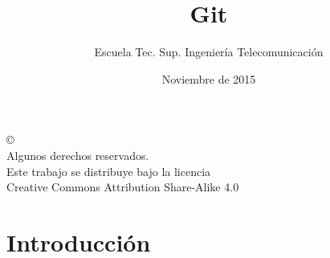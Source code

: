 \documentclass[ucs]{beamer}
\begin{document}
\title[Git]{Git}
\author[GSyC]{Escuela Tec. Sup. Ingeniería Telecomunicación}
\date[2015]{Noviembre de 2015}


\begin{frame}
  \titlepage
\end{frame}



\begin{frame}[b]
\begin{flushright}
{\tiny
\copyright \insertshortdate~\insertshortauthor \\
  Algunos derechos reservados. \\
  Este trabajo se distribuye bajo la licencia \\
  Creative Commons Attribution Share-Alike 4.0\\
}
\end{flushright}  
\end{frame}





\section{Introducción}
\end{document}
